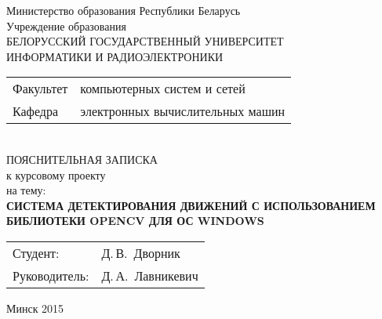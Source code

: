 \begin{titlepage}
  \begin{center}
    Министерство образования Республики Беларусь\\[1em]
    Учреждение образования\\
    БЕЛОРУССКИЙ ГОСУДАРСТВЕННЫЙ УНИВЕРСИТЕТ \\
    ИНФОРМАТИКИ И РАДИОЭЛЕКТРОНИКИ\\[1em]

    \begin{minipage}{\textwidth}
      \begin{flushleft}
        \begin{tabular}{ l l }
          Факультет & компьютерных систем и сетей\\
          Кафедра   & электронных вычислительных машин
        \end{tabular}
      \end{flushleft}
    \end{minipage}\\[7em]

    {ПОЯСНИТЕЛЬНАЯ ЗАПИСКА}\\
    {к курсовому проекту}\\
    {на тему:}\\[1em]
    \textbf{\large СИСТЕМА ДЕТЕКТИРОВАНИЯ ДВИЖЕНИЙ С ИСПОЛЬЗОВАНИЕМ БИБЛИОТЕКИ OPENCV ДЛЯ ОС WINDOWS}\\[4em]
    
    \begin{tabular}{ p{}p{} }
      Студент: & Д.\,В.~Дворник \\
      Руководитель: & Д.\,А.~Лавникевич \\
    \end{tabular}
    
    \vfill
    {\normalsize Минск 2015}
  \end{center}
\end{titlepage}
